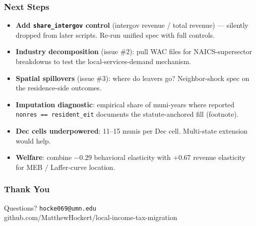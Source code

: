 \documentclass[xcolor = x11names, compress, aspectratio = 169]{beamer}
\begin{document}
    \begin{frame}
    \frametitle{Next Steps}
        \footnotesize
        \begin{itemize}\setlength{\itemsep}{0.05cm}
            \item \textbf{Add \texttt{share\_intergov} control} (intergov
            revenue / total revenue) --- silently dropped from later
            scripts. Re-run unified spec with full controls.
            \item \textbf{Industry decomposition} (issue \#2): pull WAC files
            for NAICS-supersector breakdowns to test the
            local-services-demand mechanism.
            \item \textbf{Spatial spillovers} (issue \#3): where do leavers go?
            Neighbor-shock spec on the residence-side outcomes.
            \item \textbf{Imputation diagnostic}: empirical share of
            muni-years where reported \texttt{nonres == resident\_eit}
            documents the statute-anchored fill (footnote).
            \item \textbf{Dec cells underpowered}: 11--15 munis per Dec cell.
            Multi-state extension would help.
            \item \textbf{Welfare}: combine $-0.29$ behavioral elasticity
            with $+0.67$ revenue elasticity for MEB / Laffer-curve location.
        \end{itemize}
    \end{frame}

    \begin{frame}
    \frametitle{Thank You}
        \centering
        \vfill
        \Large Questions?
        \vfill
        \normalsize
        \texttt{hocke069@umn.edu} \\
        \small github.com/MatthewHockert/local-income-tax-migration
        \vfill
    \end{frame}
\end{document}

